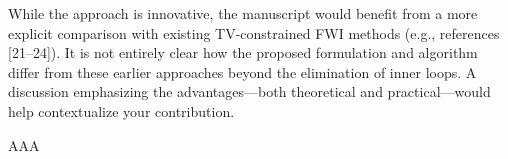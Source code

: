 \begin{point}
	While the approach is innovative, the manuscript would benefit from a more explicit comparison with existing TV-constrained FWI methods (e.g., references [21–24]). It is not entirely clear how the proposed formulation and algorithm differ from these earlier approaches beyond the elimination of inner loops. A discussion emphasizing the advantages—both theoretical and practical—would help contextualize your contribution.
\end{point}

\begin{reply}
	AAA
\end{reply}

